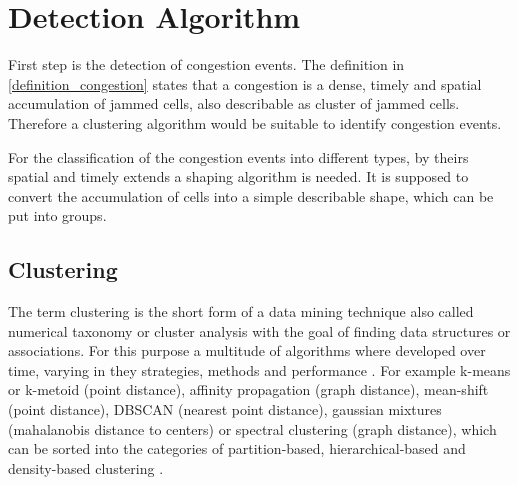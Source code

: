 \documentclass[a4paper,12pt]{report}
\begin{document}
\bigskip

\section{Detection Algorithm}
First step is the detection of congestion events. The definition in \ref{definition_congestion} states that a congestion is a dense, timely and spatial accumulation of jammed cells, also describable as cluster of jammed cells. Therefore a clustering algorithm would be suitable to identify congestion events.

For the classification of the congestion events into different types, by theirs spatial and timely extends a shaping algorithm is needed. It is supposed to convert the accumulation of cells into a simple describable shape, which can be put into groups.

\subsection{Clustering}
\label{methodology_clustering}
The term clustering is the short form of a data mining technique also called numerical taxonomy or cluster analysis with the goal of finding data structures or associations. For this purpose a multitude of algorithms where developed over time, varying in they strategies, methods and performance \cite{Busch2004}. For example k-means or k-metoid (point distance), affinity propagation (graph distance), mean-shift (point distance), DBSCAN (nearest point distance), gaussian mixtures (mahalanobis distance to centers) or spectral clustering (graph distance), which can be sorted into the categories of partition-based, hierarchical-based and density-based clustering \cite{Chauhan2020,Yildirim2020}.
\end{document}
